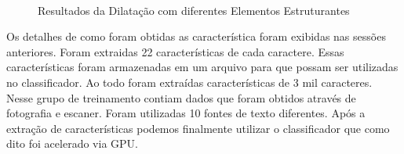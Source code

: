 \documentclass[letterpaper, 10 pt, conference]{ieeeconf}  %
\begin{document}
\begin{figure}[H] \centering

\\

\caption{Resultados da Dilatação com diferentes Elementos Estruturantes}
\label{fig:Figura01}
\end{figure}

Os detalhes de como foram obtidas as característica foram exibidas nas sessões
anteriores. Foram extraidas 22 características de cada caractere. Essas
características foram armazenadas em um arquivo para que possam ser utilizadas
no classificador. Ao todo foram extraídas características de 3 mil
caracteres. Nesse grupo de treinamento contiam dados que foram obtidos através
de fotografia e escaner. Foram utilizadas 10 fontes de texto diferentes.
Após a extração de características podemos finalmente utilizar o classificador
que como dito foi acelerado via GPU.
\end{document}
